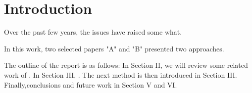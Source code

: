 \section{Introduction}

Over the past few years, the issues have raised some what.

In this work, two selected papers "A" and "B" presented two approaches.

The outline of the report is as follows: In Section II,
we will review some related work of  . In Section III,  . The next method is then introduced in Section III. Finally,conclusions and future work in Section V and VI.